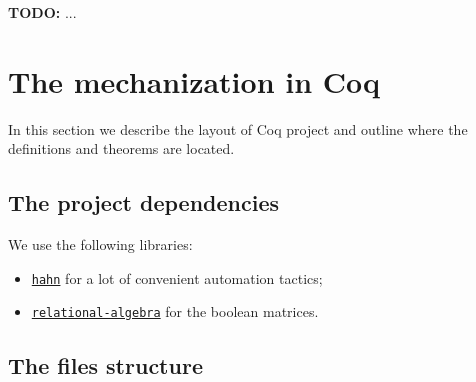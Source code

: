 \documentclass[14pt]{constructor-thesis}
\theoremstyle{definition}
\newcommand{\todo}[1]{
  \begin{tcolorbox}[colframe=red!75!black,colback=red!5!white,arc=0pt,fonttitle=\bfseries]
  \textbf{TODO:} #1
  \end{tcolorbox}
}
\begin{document}
\todo{...}

\section{The mechanization in Coq}

In this section we describe the layout of Coq project and outline where the definitions and theorems are located.

\subsection{The project dependencies}

We use the following libraries:
\begin{itemize}
  \item \href{https://github.com/vafeiadis/hahn}{\texttt{hahn}} for a lot of convenient automation tactics;
  \item \href{http://perso.ens-lyon.fr/damien.pous/ra/}{\texttt{relational-algebra}} for the boolean matrices.
\end{itemize}

\subsection{The files structure}
\end{document}
